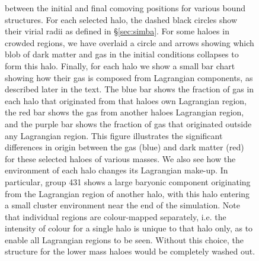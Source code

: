 \documentclass[fleqn,usenatbib]{mnras}
\begin{document}
\begin{figure}
{ between the initial and final comoving positions for various bound
 structures. For each selected halo, the dashed black circles show their
 virial radii as defined in \S \ref{sec:simba}. For some haloes in crowded
 regions, we have overlaid a circle and arrows showing which blob of dark
 matter and gas in the initial conditions collapses to form this halo.
 Finally, for each halo we show a small bar chart showing how their gas is
 composed from Lagrangian components, as described later in the text. The
 blue bar shows the fraction of gas in each halo that originated from that
 haloes own Lagrangian region, the red bar shows the gas from another haloes
 Lagrangian region, and the purple bar shows the fraction of gas that
 originated outside any Lagrangian region. This figure illustrates the
 significant differences in origin between the gas (blue) and dark matter
 (red) for these selected haloes of various masses. We also see how the
 environment of each halo changes its Lagrangian make-up. In particular,
 group 431 shows a large baryonic component originating from the Lagrangian
 region of another halo, with this halo entering a small cluster environment
 near the end of the simulation. Note that individual regions are
 colour-mapped separately, i.e. the intensity of colour for a single halo is
 unique to that halo only, as to enable all Lagrangian regions to be seen.
 Without this choice, the structure for the lower mass haloes would be
 completely washed out.}
	\vspace{1cm}
	\label{fig:bigtransferpic}
\end{figure}
\end{document}
